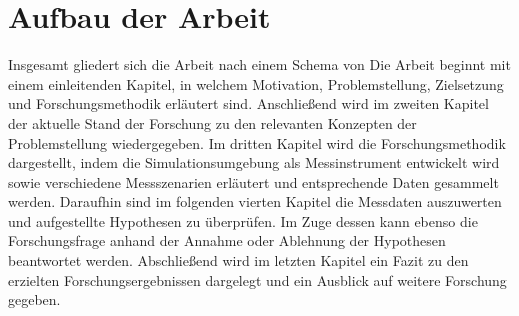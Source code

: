 \section{Aufbau der Arbeit}

Insgesamt gliedert sich die Arbeit nach einem Schema von \cite[]{Holzweiig.2022}
Die Arbeit beginnt mit einem einleitenden Kapitel, in welchem Motivation, Problemstellung, Zielsetzung und Forschungsmethodik erläutert sind.
Anschließend wird im zweiten Kapitel der aktuelle Stand der Forschung zu den relevanten Konzepten der Problemstellung wiedergegeben.
Im dritten Kapitel wird die Forschungsmethodik dargestellt, indem die Simulationsumgebung als Messinstrument entwickelt wird sowie verschiedene Messszenarien erläutert und entsprechende Daten gesammelt werden. 
Daraufhin sind im folgenden vierten Kapitel die Messdaten auszuwerten und aufgestellte Hypothesen zu überprüfen.
Im Zuge dessen kann ebenso die Forschungsfrage anhand der Annahme oder Ablehnung der Hypothesen beantwortet werden.
Abschließend wird im letzten Kapitel ein Fazit zu den erzielten Forschungsergebnissen dargelegt und ein Ausblick auf weitere Forschung gegeben.
